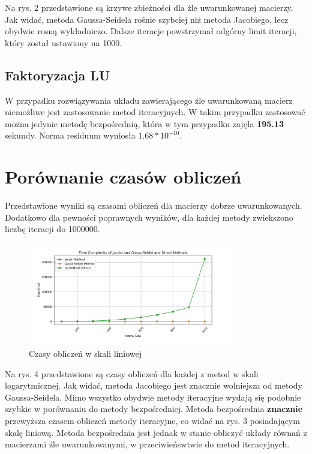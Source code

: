 \documentclass[a4paper,12pt]{article}  %
\begin{document}
Na rys. 2 przedstawione są krzywe zbieżności dla źle uwarunkowanej
macierzy. Jak widać, metoda Gaussa-Seidela rośnie szybciej niż metoda
Jacobiego, lecz obydwie rosną wykładniczo. Dalsze iteracje powstrzymał
odgórny limit iteracji, który został ustawiony na 1000.

\subsection{Faktoryzacja LU}
W przypadku rozwiązywania układu zawierającego źle uwarunkowaną macierz
niemożliwe jest zastosowanie metod iteracyjnych. W takim przypadku
zastosować można jedynie metodę bezpośrednią, która w tym przypadku
zajęła \textbf{195.13} sekundy. Norma residuum wyniosła \textbf{$1.68*10^{-10}$}.

\pagebreak
\section{Porównanie czasów obliczeń}
Przedstawione wyniki są czasami obliczeń dla macierzy dobrze
uwarunkowanych. Dodatkowo dla pewności poprawnych wyników, dla każdej
metody zwiekszono liczbę iteracji do 1000000.

\begin{figure}[H]
  \centering
  \includegraphics[width=0.8\textwidth]{./graphs/time_complexity_linear.png}
  \caption{Czasy obliczeń w skali liniowej}
\end{figure}

Na rys. 4 przedstawione są czasy obliczeń dla każdej z metod 
w skali logarytmicznej. Jak widać, metoda Jacobiego jest znacznie wolniejsza
od metody Gaussa-Seidela. Mimo wszystko obydwie metody iteracyjne wydają się
podobnie szybkie w porównaniu do metody bezpośredniej. Metoda bezpośrednia
\textbf{znacznie} przewyższa czasem obliczeń metody iteracyjne, co widać na rys.
3 posiadającym skalę liniową. Metoda bezpośrednia jest jednak w stanie obliczyć
układy równań z macierzami źle uwarunkowanymi, w przeciwieńswtwie do metod
iteracyjnych.
\end{document}
